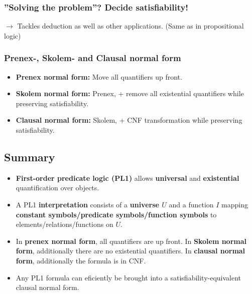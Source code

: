 \documentclass[conference]{styles/acmsiggraph}
\begin{document}
        \subsubsection{''Solving the problem''? Decide satisfiability!}
            $\rightarrow$ Tackles deduction as well as other applications. (Same as in propositional logic)

        \subsubsection{Prenex-, Skolem- and Clausal normal form}
            \begin{itemize}
                \item \textbf{Prenex normal form:} Move all quantifiers up front.
                \item \textbf{Skolem normal form:} Prenex, + remove all existential quantifiers while preserving satisfiability.
                \item \textbf{Clausal normal form:} Skolem, + CNF transformation while preserving satisfiability.
            \end{itemize}
        
    \subsection{Summary}
        \begin{itemize}
            \item \textbf{First-order predicate logic (PL1)} allows \textbf{universal} and \textbf{existential} quantification over objects.
            \item A PL1 \textbf{interpretation} consists of a \textbf{universe $U$} and a function $I$ mapping \textbf{constant symbols/predicate symbols/function symbols} to elements/relations/functions on $U$.
            \item In \textbf{prenex normal form}, all quantifiers are up front. In \textbf{Skolem normal form}, additionally there are no existential quantifiers. In \textbf{clausal normal form}, additionally the formula is in CNF.
            \item Any PL1 formula can eficiently be brought into a satisfiability-equivalent clausal normal form.
        \end{itemize}
    
    
    
    
    
    
    
\end{document}
